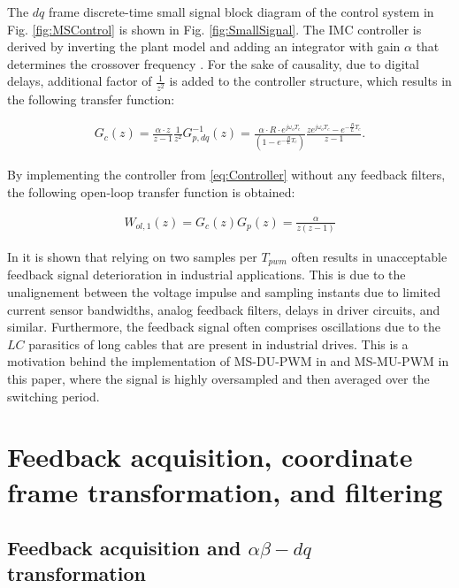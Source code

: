 \documentclass[conference]{IEEEtran}
\begin{document}
The $dq$ frame discrete-time small signal block diagram of the control system in Fig. \ref{fig:MSControl} is shown in Fig. \ref{fig:SmallSignal}. The IMC controller is derived by inverting the plant model and adding an integrator with gain $\alpha$ that determines the crossover frequency \cite{vuksa2016}. For the sake of causality, due to digital delays, additional factor of $\frac{1}{z^2}$ is added to the controller structure, which results in the following transfer function:

\begin{equation}
\begin{aligned}
G_{c}(z) =  \frac{\alpha \cdot z}{z-1} \frac{1}{z^2} G^{-1}_{p,dq}(z)  =   \frac{\alpha \cdot R \cdot e^{j\omega_o T_c}}{\left( 1 - e^{-\frac{R}{L}T_c}\right)}\frac{z e^{j\omega_o T_c}-e^{-\frac{R}{L}T_c}}{z-1}.
\label{eq:Controller} 
\end{aligned}    
\end{equation}

By implementing the controller from \eqref{eq:Controller} without any feedback filters, the following open-loop transfer function is obtained:

\begin{equation}
\begin{aligned}
W_{ol,1}(z) = G_c(z) G_p(z) =  \frac{\alpha}{z(z-1)}
\label{eq:OpenLoop} 
\end{aligned}    
\end{equation}

In \cite{vuksa2016} it is shown that relying on two samples per $T_{pwm}$ often results in unacceptable feedback signal deterioration in industrial applications. This is due to the unalignement between the voltage impulse and sampling instants due to limited current sensor bandwidths, analog feedback filters, delays in driver circuits, and similar. Furthermore, the feedback signal often comprises oscillations due to the $LC$ parasitics of long cables that are present in industrial drives. This is a motivation behind the implementation of MS-DU-PWM in \cite{vuksa2016} and MS-MU-PWM in this paper, where the signal is highly oversampled and then averaged over the switching period.

\section{Feedback acquisition, coordinate frame transformation, and filtering}

\subsection{Feedback acquisition and $\alpha \beta - dq$ transformation}
\end{document}
